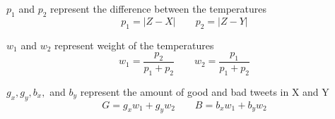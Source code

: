 $p_1$ and $p_2$ represent the difference between the temperatures
\begin{equation} \label{eq:p} p_{1}=\left | Z-X \right |	\qquad p_{2}=\left | Z-Y \right |	 \end{equation}

$w_1$ and $w_2$ represent weight of the temperatures
\begin{equation} \label{eq:w} w_{1}=\frac{p_{2}}{p_{1}+p_{2}} 	\qquad w_{2}=\frac{p_{1}}{p_{1}+p_{2}}   \end{equation}

$g_x, g_y, b_x,$ and $b_y$ represent the amount of good and bad tweets in X and Y
\begin{equation} \label{eq:gb}  G = g_{x}w_{1} + g_{y}w_{2}	\qquad B = b_{x}w_{1} + b_{y}w_{2}	 \end{equation}



